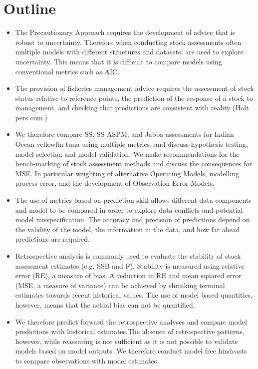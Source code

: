 \documentclass[a4paper]{article}
\begin{document}
 \section*{Outline}
\begin{itemize}
    \item The Precautionary Approach requires the development of advice that is robust to uncertainty. Therefore when conducting stock assessments often multiple models with different structures and datasets, are used to explore uncertainty. This means that it is difficult to compare models using conventional metrics such as AIC. 
    
    \item The provision of fisheries management advice requires the assessment of stock status relative to reference points, the prediction of the response of a stock to management, and checking that predictions are consistent with reality (Holt pers com.) 
    
    \item  We  therefore compare SS, SS-ASPM, and Jabba assessments for Indian Ocean yellowfin tuna  using multiple metrics, and discuss hypothesis testing, model selection and model validation. We make recommendations for the bench-marking of stock assessment methods and discuss the consequences for MSE. In particular weighting of alternative Operating Models, modelling process error, and the development of Observation Error Models.    
  
    \item The use of metrics based on prediction skill allows different data components and model to be compared in order to explore data conflicts and potential model misspecification. The accuracy and precision of predictions depend on the validity of the model, the information in the data, and how far ahead predictions are required. 
    
    \item Retrospective analysis is commonly used to evaluate the stability of stock assessment estimates (e.g. SSB and F). Stability is measured using relative error (RE), a measure of bias. A reduction in RE and mean squared error (MSE, a measure of variance) can be achieved by shrinking terminal estimates towards recent historical values. The use of model based quantities, however, means that the actual bias can not be quantified.  
    
   \item We therefore predict forward the retrospective analyses and compare model predictions with historical estimates.The absence of retrospective patterns, however, while reassuring is not sufficient as it is not possible to validate models based on model outputs. We therefore conduct model free hindcasts to compare observations with model estimates. 
\end{itemize}
\end{document}
